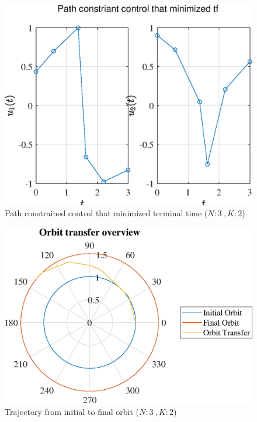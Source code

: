 \documentclass[]{article}
\begin{document}
	\begin{figure}
		\centering
		\includegraphics[scale=0.75]{path_N3_K2_C3_tf.eps}
		\caption{Path constrained control that minimized terminal time (\(N:3\ , K:2\))}
		\label{fig:path_N3_K2_C3_tf}
	\end{figure}
	\begin{figure}
		\centering
		\includegraphics[scale=0.75]{orbit_N3_K2_C3_tf.eps}
		\caption{Trajectory from initial to final orbit (\(N:3\ , K:2\))}
		\label{fig:orbit_N3_K2_C3_tf}
	\end{figure}
\end{document}
